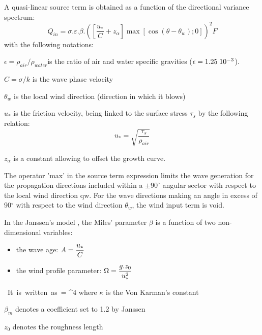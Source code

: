 A quasi-linear source term is obtained as a function of the directional
variance spectrum:
\begin{equation} \label{GrindEQ__4_27_}
  Q_{in} =\sigma .\varepsilon .\beta .\left(\left[\frac{u_{*} }{C} +z_{\alpha }
    \right]\max \left[\cos (\theta -\theta _{w} );0\right]\right)^{2} F
\end{equation}
with the following notations:

$ \epsilon = \rho_{air}/\rho_{water }$is the ratio of air and water specific
gravities ($ \epsilon = 1.25\hspace{0.1cm}10^{-3}$).

 $C = \sigma/k$ is the wave phase velocity

 $\theta_w$ is the local wind direction (direction in which it blows)

$u_*$ is the friction velocity, being linked to the surface stress $\tau_s$ by
the
following relation:
\begin{equation} \label{GrindEQ__4_28_}
u_{*} =\sqrt{\frac{\tau _{s} }{\rho _{air} } }
\end{equation}

 $z_\alpha$ is a constant allowing to offset the growth curve.

The operator 'max' in the source term expression limits the wave generation
for the propagation directions included within a $\pm 90^\circ$ angular sector
with respect to the local wind direction qw. For the wave directions making an
angle in excess of 90${}^\circ$ with respect to the wind direction $\theta_w$,
the wind input term is void.

In the Janssen's model \cite{Janssen1991}, the Miles' parameter $\beta$ is a
function of two non-dimensional variables:

\begin{itemize}
\item  the wave age:  $\displaystyle A=\frac{u_{*} }{C} $
\item  the wind profile parameter: $\displaystyle \Omega =\frac{g.z_{0} }{u_{*}^{2} } $
\end{itemize}
\bequ
\label{GrindEQ__4_29_}
\mbox{ It is written as }\beta = \mu \ln ^{4}
\mu 
\eequ
 where $\kappa$ is the Von Karman's constant

 $\beta_m$ denotes a coefficient set to 1.2 by Janssen \cite{Janssen1991}

 $z_0$ denotes the roughness length


